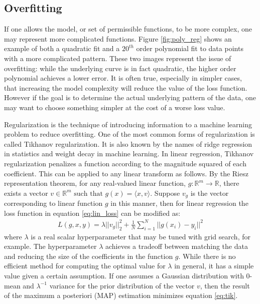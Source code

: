 \subsection{Overfitting} \label{sec:overfitting}
If one allows the model, or set of permissible functions, to be more complex, one may represent more complicated functions.  Figure \ref{fig:poly_reg} shows an example of both a quadratic fit and a $20^{th}$ order polynomial fit to data points with a more complicated pattern.  These two images represent the issue of overfitting: while the underlying curve is in fact quadratic, the higher order polynomial achieves a lower error.  It is often true, especially in simpler cases, that increasing the model complexity will reduce the value of the loss function.  However if the goal is to determine the actual underlying pattern of the data, one may want to choose something simpler at the cost of a worse loss value.

Regularization is the technique of introducing information to a machine learning problem to reduce overfitting.  One of the most common forms of regularization is called Tikhanov regularization. \cite{tikhanov} It is also known by the names of ridge regression in statistics and weight decay in machine learning.  In linear regression, Tikhanov regularization penalizes a function according to the magnitude squared of each coefficient.  This can be applied to any linear transform as follows.  By the Riesz representation theorem, for any real-valued linear function, $g: \mathbb{R}^m \rightarrow \mathbb{R}$, there exists a vector $v\in\mathbb{R}^m \text{ such that } g(x) = \langle x,v\rangle $.  Suppose $v_g$ is the vector corresponding to linear function $g$ in this manner, then for linear regression the loss function in equation \ref{eq:lin_loss} can be modified as:
\begin{align}\label{eq:tik}
L(g,x,y) = \lambda ||v_g||_2^2 + \frac{1}{N}\sum_{i=1}^N ||g(x_i)-y_i||^2
\end{align}
where $\lambda$ is a real scalar hyperparameter that may be tuned with grid search, for example.  The hyperparameter $\lambda$ achieves a tradeoff between matching the data and reducing the size of the coefficients in the function $g$.  While there is no efficient method for computing the optimal value for $\lambda$ in general, it has a simple value given a certain assumption.  If one assumes a Gaussian distribution with 0-mean and $\lambda^{-1}$ variance for the prior distribution of the vector $v$, then the result of the maximum a posteriori (MAP) estimation minimizes equation \ref{eq:tik}.

